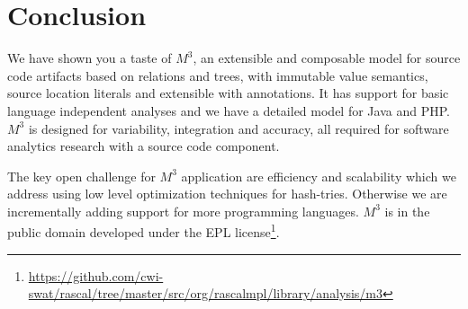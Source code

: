 \documentclass[conference]{IEEEtran}
\newcommand{\mthree}{\ensuremath{M^3}\xspace}
\begin{document}
\section{Conclusion}

We have shown you a taste of \mthree, an extensible and composable model for
source code artifacts based on relations and trees, with immutable value
semantics, source location literals and extensible with annotations. It has
support for basic language independent analyses and we have a detailed model
for Java and PHP. \mthree is designed for variability, integration and accuracy, all required for software analytics research with a source code component.


The key open challenge for \mthree application are efficiency and scalability which we address using low level optimization techniques for hash-tries. Otherwise we are incrementally adding support for more programming languages. \mthree is in the public domain developed under the EPL license\footnote{\url{https://github.com/cwi-swat/rascal/tree/master/src/org/rascalmpl/library/analysis/m3}}.



\end{document}
